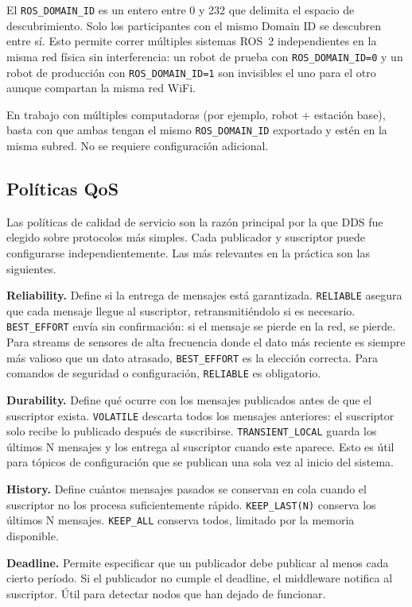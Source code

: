 El \texttt{ROS\_DOMAIN\_ID} es un entero entre 0 y 232 que delimita el espacio de descubrimiento. Solo los participantes con el mismo Domain ID se descubren entre sí. Esto permite correr múltiples sistemas ROS~2 independientes en la misma red física sin interferencia: un robot de prueba con \texttt{ROS\_DOMAIN\_ID=0} y un robot de producción con \texttt{ROS\_DOMAIN\_ID=1} son invisibles el uno para el otro aunque compartan la misma red WiFi.

En trabajo con múltiples computadoras (por ejemplo, robot + estación base), basta con que ambas tengan el mismo \texttt{ROS\_DOMAIN\_ID} exportado y estén en la misma subred. No se requiere configuración adicional.

\subsection{Políticas QoS}

Las políticas de calidad de servicio son la razón principal por la que DDS fue elegido sobre protocolos más simples. Cada publicador y suscriptor puede configurarse independientemente. Las más relevantes en la práctica son las siguientes.

\textbf{Reliability.} Define si la entrega de mensajes está garantizada. \texttt{RELIABLE} asegura que cada mensaje llegue al suscriptor, retransmitiéndolo si es necesario. \texttt{BEST\_EFFORT} envía sin confirmación: si el mensaje se pierde en la red, se pierde. Para streams de sensores de alta frecuencia donde el dato más reciente es siempre más valioso que un dato atrasado, \texttt{BEST\_EFFORT} es la elección correcta. Para comandos de seguridad o configuración, \texttt{RELIABLE} es obligatorio.

\textbf{Durability.} Define qué ocurre con los mensajes publicados antes de que el suscriptor exista. \texttt{VOLATILE} descarta todos los mensajes anteriores: el suscriptor solo recibe lo publicado después de suscribirse. \texttt{TRANSIENT\_LOCAL} guarda los últimos N mensajes y los entrega al suscriptor cuando este aparece. Esto es útil para tópicos de configuración que se publican una sola vez al inicio del sistema.

\textbf{History.} Define cuántos mensajes pasados se conservan en cola cuando el suscriptor no los procesa suficientemente rápido. \texttt{KEEP\_LAST(N)} conserva los últimos N mensajes. \texttt{KEEP\_ALL} conserva todos, limitado por la memoria disponible.

\textbf{Deadline.} Permite especificar que un publicador debe publicar al menos cada cierto período. Si el publicador no cumple el deadline, el middleware notifica al suscriptor. Útil para detectar nodos que han dejado de funcionar.


